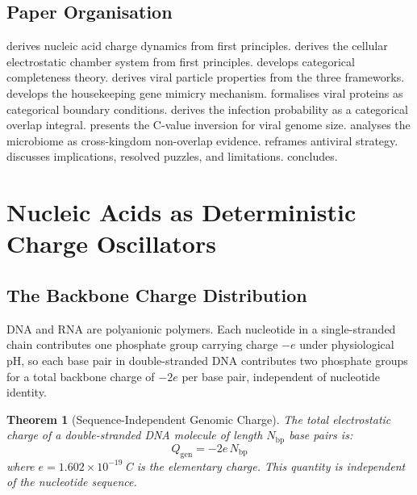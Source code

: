 \documentclass[12pt,a4paper]{article}
\newtheorem{theorem}{Theorem}[section]
\theoremstyle{definition}
\theoremstyle{remark}
\newcommand{\Qgen}{Q_{\mathrm{gen}}}
\begin{document}
\subsection{Paper Organisation}

 derives nucleic acid charge dynamics from first principles.  derives the cellular electrostatic chamber system from first principles.  develops categorical completeness theory.  derives viral particle properties from the three frameworks.  develops the housekeeping gene mimicry mechanism.  formalises viral proteins as categorical boundary conditions.  derives the infection probability as a categorical overlap integral.  presents the C-value inversion for viral genome size.  analyses the microbiome as cross-kingdom non-overlap evidence.  reframes antiviral strategy.  discusses implications, resolved puzzles, and limitations.  concludes.

\section{Nucleic Acids as Deterministic Charge Oscillators}
\label{sec:nacid}

\subsection{The Backbone Charge Distribution}

DNA and RNA are polyanionic polymers. Each nucleotide in a single-stranded chain contributes one phosphate group carrying charge $-e$ under physiological pH, so each base pair in double-stranded DNA contributes two phosphate groups for a total backbone charge of $-2e$ per base pair, independent of nucleotide identity.

\begin{theorem}[Sequence-Independent Genomic Charge]
\label{thm:genome_charge}
The total electrostatic charge of a double-stranded DNA molecule of length $N_{\mathrm{bp}}$ base pairs is:
\begin{equation}
  \Qgen = -2e \, N_{\mathrm{bp}}
  \label{eq:genome_charge}
\end{equation}
where $e = 1.602 \times 10^{-19}$\,C is the elementary charge. This quantity is independent of the nucleotide sequence.
\end{theorem}
\end{document}
